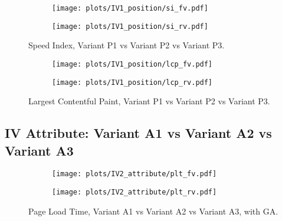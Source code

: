 \begin{figure}
	\centering
	\begin{subfigure}{.5\textwidth}
		\centering
		\texttt{[image: plots/IV1\_position/si\_fv.pdf]}
		\label{fig:sub1}
	\end{subfigure}%
	\begin{subfigure}{.5\textwidth}
		\centering
		\texttt{[image: plots/IV1\_position/si\_rv.pdf]}
		\label{fig:sub2}
	\end{subfigure}
	\caption{Speed Index, Variant P1 vs Variant P2 vs Variant P3.}
	\label{figure:plt_original_test}
\end{figure}


\begin{figure}
	\centering
	\begin{subfigure}{.5\textwidth}
		\centering
		\texttt{[image: plots/IV1\_position/lcp\_fv.pdf]}
		\label{fig:sub1}
	\end{subfigure}%
	\begin{subfigure}{.5\textwidth}
		\centering
		\texttt{[image: plots/IV1\_position/lcp\_rv.pdf]}
		\label{fig:sub2}
	\end{subfigure}
	\caption{Largest Contentful Paint, Variant P1 vs Variant P2 vs Variant P3.}
	\label{figure:plt_original_test}
\end{figure}


\clearpage



\subsection{IV Attribute: Variant A1 vs Variant A2 vs Variant A3}


\begin{figure}
	\centering
	\begin{subfigure}{.5\textwidth}
		\centering
		\texttt{[image: plots/IV2\_attribute/plt\_fv.pdf]}
		\label{fig:sub1}
	\end{subfigure}%
	\begin{subfigure}{.5\textwidth}
		\centering
		\texttt{[image: plots/IV2\_attribute/plt\_rv.pdf]}
		\label{fig:sub2}
	\end{subfigure}
	\caption{Page Load Time, Variant A1 vs Variant A2 vs Variant A3, with GA.}
	\label{figure:plt_original_test}
\end{figure}


